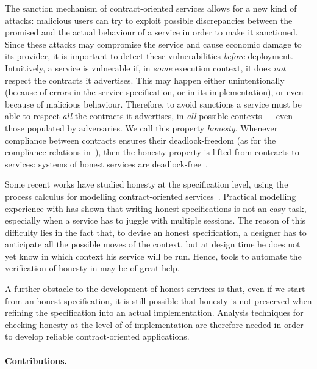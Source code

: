 The sanction mechanism of contract-oriented services
allows for a new kind of attacks: 
malicious users can try to exploit possible discrepancies between
the promised and the actual behaviour of a service
in order to make it sanctioned. %
Since these attacks may compromise the service and cause economic damage to its provider,
it is important to detect these vulnerabilities \emph{before} deployment. %
Intuitively, a service is vulnerable if, 
in \emph{some} execution context,
it does \emph{not} respect the contracts it advertises.
This may happen either unintentionally
(because of errors in the service specification, or in its implementation),
or even because of malicious behaviour.
Therefore, to avoid sanctions a service must be able
to respect \emph{all} the contracts it advertises, in \emph{all} possible contexts
--- even those populated by adversaries.
We call this property \emph{honesty}.
Whenever compliance between contracts ensures their deadlock-freedom 
(as for the compliance relations in~\cite{Acciai10coordination,Barbanera10ppdp,Laneve07concur,Rensink07infoco}),
then the honesty property is lifted from contracts to services:
systems of honest services are deadlock-free~\cite{BZ15wsfm}.

Some recent works have studied honesty at the specification level, 
using the process calculus \coco for modelling contract-oriented services~\cite{BMSZ15jlamp,BTZ12sacs,BZ15wsfm}.
Practical modelling experience with \coco has shown that writing honest specifications
is not an easy task, especially when a service has to juggle with multiple sessions.
The reason of this difficulty lies in the fact that,
to devise an honest specification, 
a designer has to anticipate all the possible moves of the context,
but at design time he does not yet know in which context his service will be run.
%
Hence, tools to automate the verification of honesty in \coco 
may be of great help.

A further obstacle to the development of honest services is that, 
even if we start from an honest \coco specification, 
it is still possible that honesty is not preserved
when refining the specification into an actual implementation.
%
Analysis techniques for checking honesty at the level of of implementation
are therefore needed in order to develop reliable contract-oriented applications.

\paragraph{Contributions.}

